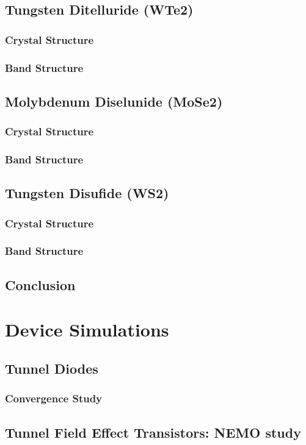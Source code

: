\documentclass[microe]{ritthesis}
\begin{document}
\section{Tungsten Ditelluride (WTe2)}
\subsection{Crystal Structure}
\subsection{Band Structure}
\section{Molybdenum Diselunide (MoSe2)}
\subsection{Crystal Structure}
\subsection{Band Structure}
\section{Tungsten Disufide (WS2)}
\subsection{Crystal Structure}
\subsection{Band Structure}
\section{Conclusion}

\chapter{Device Simulations}
\section{Tunnel Diodes}
\subsection{Convergence Study}
\section{Tunnel Field Effect Transistors: NEMO study}
\end{document}
